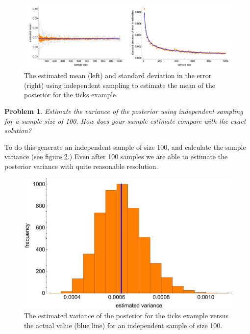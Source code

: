 \documentclass{article}
\newtheorem{problem}{Problem}[section]
\begin{document}
\begin{figure}[ht]
\centerline{\includegraphics[width=1.5\textwidth]{../figures/prob3_ticksIndependentSampleSize.pdf}}
\caption{The estimated mean (left) and standard deviation in the error (right) using independent sampling to estimate the mean of the posterior for the ticks example.}\label{fig:ticks_independentSampleSize}
\end{figure}

\begin{problem}
Estimate the variance of the posterior using independent sampling for a sample size of 100. How does your sample estimate compare with the exact solution?
\end{problem}

To do this generate an independent sample of size 100, and calculate the sample variance (see figure  \ref{fig:ticks_independentVariance}.) Even after 100 samples we are able to estimate the posterior variance with quite reasonable resolution.

\begin{figure}[ht]
\centerline{\includegraphics[width=1\textwidth]{../figures/prob3_ticksIndependentVariance.pdf}}
\caption{The estimated variance of the posterior for the ticks example versus the actual value (blue line) for an independent sample of size 100.}\label{fig:ticks_independentVariance}
\end{figure}
\end{document}
